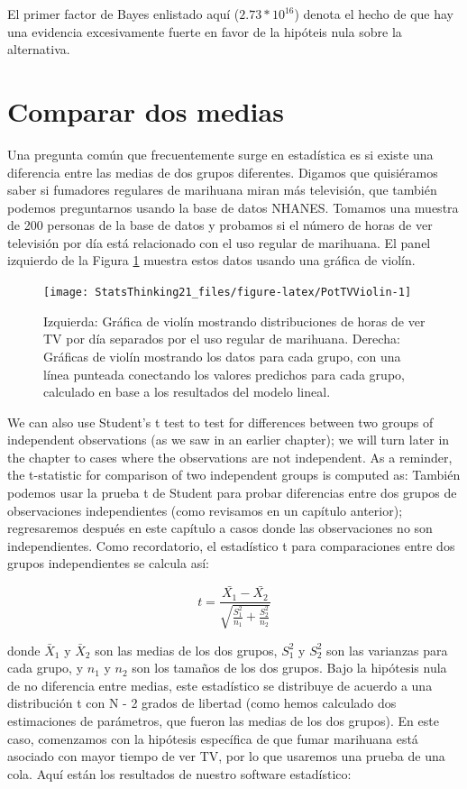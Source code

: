 \documentclass[
  12pt,
]{book}
\theoremstyle{definition}
\theoremstyle{definition}
\theoremstyle{definition}
\theoremstyle{remark}
\begin{document}
El primer factor de Bayes enlistado aquí (\(2.73 * 10^{16}\)) denota el hecho de que hay una evidencia excesivamente fuerte en favor de la hipóteis nula sobre la alternativa.

\hypertarget{comparing-two-means}{%
\section{Comparar dos medias}\label{comparing-two-means}}

Una pregunta común que frecuentemente surge en estadística es si existe una diferencia entre las medias de dos grupos diferentes. Digamos que quisiéramos saber si fumadores regulares de marihuana miran más televisión, que también podemos preguntarnos usando la base de datos NHANES. Tomamos una muestra de 200 personas de la base de datos y probamos si el número de horas de ver televisión por día está relacionado con el uso regular de marihuana. El panel izquierdo de la Figura \ref{fig:PotTVViolin} muestra estos datos usando una gráfica de violín.

\begin{figure}
\texttt{[image: StatsThinking21\_files/figure-latex/PotTVViolin-1]} \caption{Izquierda: Gráfica de violín mostrando distribuciones de horas de ver TV por día separados por el uso regular de marihuana. Derecha: Gráficas de violín mostrando los datos para cada grupo, con una línea punteada conectando los valores predichos para cada grupo, calculado en base a los resultados del modelo lineal.}\label{fig:PotTVViolin}
\end{figure}

We can also use Student's t test to test for differences between two groups of independent observations (as we saw in an earlier chapter); we will turn later in the chapter to cases where the observations are not independent. As a reminder, the t-statistic for comparison of two independent groups is computed as:
También podemos usar la prueba t de Student para probar diferencias entre dos grupos de observaciones independientes (como revisamos en un capítulo anterior); regresaremos después en este capítulo a casos donde las observaciones no son independientes. Como recordatorio, el estadístico t para comparaciones entre dos grupos independientes se calcula así:

\[
t = \frac{\bar{X_1} - \bar{X_2}}{\sqrt{\frac{S_1^2}{n_1} + \frac{S_2^2}{n_2}}}
\]

donde \(\bar{X}_1\) y \(\bar{X}_2\) son las medias de los dos grupos, \(S^2_1\) y \(S^2_2\) son las varianzas para cada grupo, y \(n_1\) y \(n_2\) son los tamaños de los dos grupos. Bajo la hipótesis nula de no diferencia entre medias, este estadístico se distribuye de acuerdo a una distribución t con N - 2 grados de libertad (como hemos calculado dos estimaciones de parámetros, que fueron las medias de los dos grupos). En este caso, comenzamos con la hipótesis específica de que fumar marihuana está asociado con mayor tiempo de ver TV, por lo que usaremos una prueba de una cola. Aquí están los resultados de nuestro software estadístico:
\end{document}
